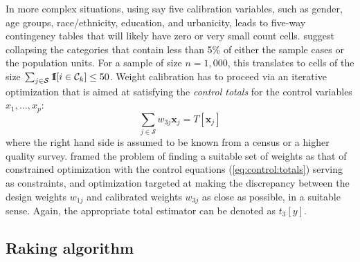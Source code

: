 In more complex situations, using say five calibration variables,
such as gender, age groups, race/ethnicity, education, and urbanicity,
leads to five-way contingency tables that will likely have zero or
very small count cells. \citet{batt:izra:hoag:fran:2009} suggest
collapsing the categories that contain less than 5\% of either
the sample cases or the population units. For a sample of size
$n=1,000$, this translates to cells of the size
$\sum_{j \in \mathcal{S}} {\rm 1\kern-.3em I}[i \in \mathcal{C}_k] \le 50$.
Weight calibration has to proceed
via an iterative optimization that is aimed at satisfying
the {\it control totals} for the control variables $x_1, \ldots, x_p$:
\begin{equation}
    \sum_{j \in \mathcal{S}} w_{3j} \mathbf{x}_j
    = T [ \mathbf{x}_j  ]
    \label{eq:control:totals}
\end{equation}
where the right hand side is assumed to be known from a census or
a higher quality survey.
\citet{deville:sarndal:1992} framed the problem of finding a suitable
set of weights as that of constrained optimization with the control
equations (\ref{eq:control:totals}) serving as constraints,
and optimization targeted at making the discrepancy between
the design weights $w_{1j}$ and calibrated weights
$w_{3j}$ as close as possible, in a suitable sense. Again,
the appropriate total estimator can be denoted as $t_3[y]$.

\subsection{Raking algorithm}
\label{subsec:raking:algorithm}

